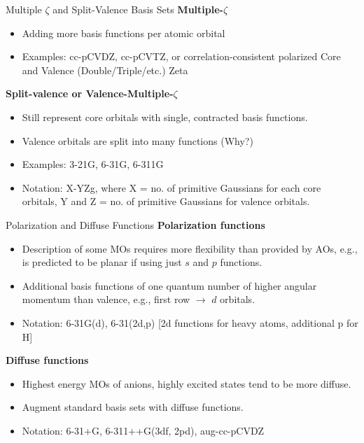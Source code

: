 \documentclass[aspectratio=169]{beamer}
\begin{document}
    \begin{frame}{Multiple $\zeta$ and Split-Valence Basis Sets}
        \textbf{Multiple-$\zeta$}
        \begin{itemize}
            \item Adding more basis functions per atomic orbital
            \item Examples: cc-pCVDZ, cc-pCVTZ, or correlation-consistent polarized Core and Valence (Double/Triple/etc.) Zeta
        \end{itemize}

        \textbf{Split-valence or Valence-Multiple-$\zeta$}
        \begin{itemize}
            \item Still represent core orbitals with single, contracted basis functions.
            \item Valence orbitals are split into many functions (Why?)
            \item Examples: 3-21G, 6-31G, 6-311G
            \item Notation: X-YZg, where X = no. of primitive Gaussians for each core orbitals, Y and Z = no. of primitive Gaussians for valence orbitals.
        \end{itemize}

    \end{frame}

    \begin{frame}{Polarization and Diffuse Functions}
        \textbf{Polarization functions}
        \begin{itemize}
            \item Description of some MOs requires more flexibility than provided by AOs, e.g.,  is predicted to be planar if using just $s$ and $p$ functions.
            \item Additional basis functions of one quantum number of higher angular momentum than valence, e.g., first row $\rightarrow$ $d$ orbitals.
            \item Notation: 6-31G(d), 6-31(2d,p) [2d functions for heavy atoms, additional p for H]
        \end{itemize}

        \textbf{Diffuse functions}
        \begin{itemize}
            \item Highest energy MOs of anions, highly excited states tend to be more diffuse.
            \item Augment standard basis sets with diffuse functions.
            \item Notation: 6-31+G, 6-311++G(3df, 2pd), aug-cc-pCVDZ
        \end{itemize}

    \end{frame}
\end{document}
